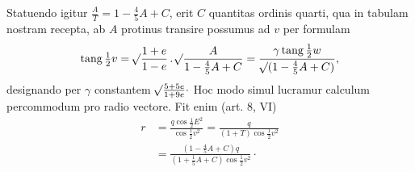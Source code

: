 Statuendo igitur $\frac{A}{T}=1-\frac{4}{5}A+C$, erit $C$ quantitas ordinis quarti, qua in tabulam nostram recepta, ab $A$ protinus transire possumus ad $v$ per formulam
\[
\operatorname{tang}\tfrac{1}{2}v=\mathord{{}^{}\!\surd}\frac{1+e}{1-e}\,\mathord{.}\,\mathord{{}^{}\!\surd}\frac{A}{1-\frac{4}{5}A+C}=\frac{\gamma\operatorname{tang}\tfrac{1}{2}w}{\mathord{{}^{}\!\surd}(1-\frac{4}{5}A+C)},
\]
designando per $\gamma$ constantem $\mathord{{}^{}\!\surd}\frac{5+5e}{1+9e}\cdot$ Hoc modo simul lucramur calculum percommodum pro radio vectore. Fit enim (art. 8, VI)
\[
\begin{aligned}
r&=\frac{q\cos\tfrac{1}{2}E^2}{\cos\tfrac{1}{2}v^2}=\frac{q}{(1+T)\cos\tfrac{1}{2}v^2}\\
&=\frac{(1-\frac{4}{5}A+C)q}{(1+\frac{1}{5}A+C)\cos\tfrac{1}{2}v^2}\cdot
\end{aligned}
\]
